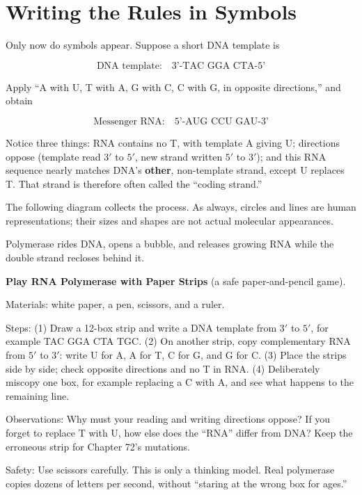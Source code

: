\section{Writing the Rules in Symbols}

Only now do symbols appear. Suppose a short DNA template is

\[ \text{DNA template:}\quad \text{3'-TAC GGA CTA-5'} \]

Apply ``A with U, T with A, G with C, C with G, in opposite directions,'' and obtain

\[ \text{Messenger RNA:}\quad \text{5'-AUG CCU GAU-3'} \]

Notice three things: RNA contains no T, with template A giving U; directions oppose (template read $3'$ to $5'$, new strand written $5'$ to $3'$); and this RNA sequence nearly matches DNA's \textbf{other}, non-template strand, except U replaces T. That strand is therefore often called the ``coding strand.''

The following diagram collects the process. As always, circles and lines are human representations; their sizes and shapes are not actual molecular appearances.

\begin{center}
\end{center}

Polymerase rides DNA, opens a bubble, and releases growing RNA while the double strand recloses behind it.

\begin{shiyan}
\textbf{Play RNA Polymerase with Paper Strips} (a safe paper-and-pencil game).

Materials: white paper, a pen, scissors, and a ruler.

Steps: (1) Draw a 12-box strip and write a DNA template from $3'$ to $5'$, for example TAC GGA CTA TGC. (2) On another strip, copy complementary RNA from $5'$ to $3'$: write U for A, A for T, C for G, and G for C. (3) Place the strips side by side; check opposite directions and no T in RNA. (4) Deliberately miscopy one box, for example replacing a C with A, and see what happens to the remaining line.

Observations: Why must your reading and writing directions oppose? If you forget to replace T with U, how else does the ``RNA'' differ from DNA? Keep the erroneous strip for Chapter 72's mutations.

Safety: Use scissors carefully. This is only a thinking model. Real polymerase copies dozens of letters per second, without ``staring at the wrong box for ages.''
\end{shiyan}

